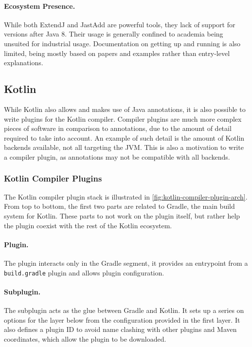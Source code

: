 \paragraph{Ecosystem Presence.}
While both ExtendJ and JastAdd are powerful tools, they lack of support for versions after Java 8.
Their usage is generally confined to academia being unsuited for industrial usage.
Documentation on getting up and running is also limited,
being mostly based on papers and examples rather than entry-level explanations.



\subsection{Kotlin}\label{sec:lang-preprocessors:kotlin}

While Kotlin also allows and makes use of Java annotations, it is also possible to write plugins for the Kotlin compiler.
Compiler plugins are much more complex pieces of software in comparison to annotations,
due to the amount of detail required to take into account.
An example of such detail is the amount of Kotlin backends available, not all targeting the \gls{JVM}.
This is also a motivation to write a compiler plugin, as annotations may not be compatible with all backends.

\subsubsection*{Kotlin Compiler Plugins}\label{sec:lang-preprocessors:kotlin:annotation}
The Kotlin compiler plugin stack is illustrated in \autoref{fig:kotlin-compiler-plugin-arch}.
From top to bottom, the first two parts are related to Gradle, the main build system for Kotlin.
These parts to not work on the plugin itself, but rather help the plugin coexist with the rest of the Kotlin ecosystem.

\paragraph{Plugin.}
The plugin interacts only in the Gradle segment,
it provides an entrypoint from a \texttt{build.gradle} plugin and allows plugin configuration.

\paragraph{Subplugin.}
The subplugin acts as the glue between Gradle and Kotlin.
It sets up a series on options for the layer below from the configuration provided in the first layer.
It also defines a plugin ID to avoid name clashing with other plugins and Maven coordinates, which allow the plugin to be downloaded.

